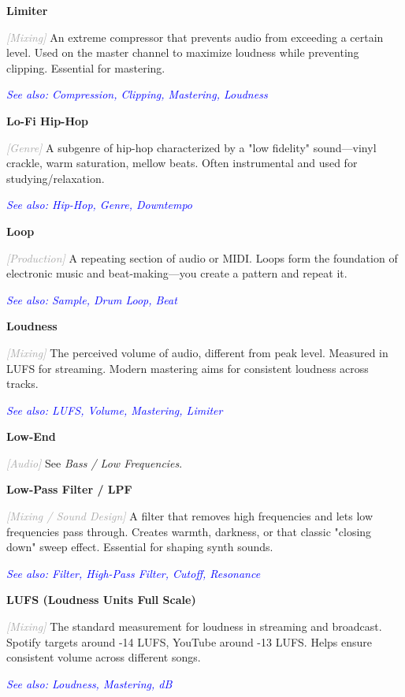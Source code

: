 \documentclass[11pt,letterpaper]{article}
\newcommand{\term}[1]{\textbf{\large\color{purple}#1}}
\newcommand{\category}[1]{\textcolor{darkgray}{\textit{\small [#1]}}}
\newcommand{\seealso}[1]{\textcolor{blue}{\textit{See also: #1}}}
\newenvironment{termdef}[1]
  {\noindent\term{#1}\par\nopagebreak}
  {\par\vspace{0.3em}}
\begin{document}
\begin{termdef}{Limiter}
\category{Mixing}
An extreme compressor that prevents audio from exceeding a certain level. Used on the master channel to maximize loudness while preventing clipping. Essential for mastering.

\seealso{Compression, Clipping, Mastering, Loudness}
\end{termdef}

\begin{termdef}{Lo-Fi Hip-Hop}
\category{Genre}
A subgenre of hip-hop characterized by a "low fidelity" sound—vinyl crackle, warm saturation, mellow beats. Often instrumental and used for studying/relaxation.

\seealso{Hip-Hop, Genre, Downtempo}
\end{termdef}

\begin{termdef}{Loop}
\category{Production}
A repeating section of audio or MIDI. Loops form the foundation of electronic music and beat-making—you create a pattern and repeat it.

\seealso{Sample, Drum Loop, Beat}
\end{termdef}

\begin{termdef}{Loudness}
\category{Mixing}
The perceived volume of audio, different from peak level. Measured in LUFS for streaming. Modern mastering aims for consistent loudness across tracks.

\seealso{LUFS, Volume, Mastering, Limiter}
\end{termdef}

\begin{termdef}{Low-End}
\category{Audio}
See \textit{Bass / Low Frequencies}.
\end{termdef}

\begin{termdef}{Low-Pass Filter / LPF}
\category{Mixing / Sound Design}
A filter that removes high frequencies and lets low frequencies pass through. Creates warmth, darkness, or that classic "closing down" sweep effect. Essential for shaping synth sounds.

\seealso{Filter, High-Pass Filter, Cutoff, Resonance}
\end{termdef}

\begin{termdef}{LUFS (Loudness Units Full Scale)}
\category{Mixing}
The standard measurement for loudness in streaming and broadcast. Spotify targets around -14 LUFS, YouTube around -13 LUFS. Helps ensure consistent volume across different songs.

\seealso{Loudness, Mastering, dB}
\end{termdef}
\end{document}
